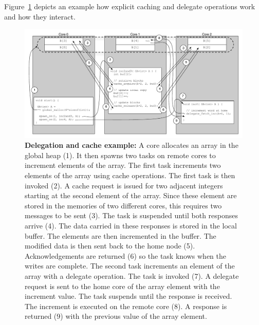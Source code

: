 Figure~\ref{fig:delegate-cache} depicts an example how explicit caching and
delegate operations work and how they interact.

\begin{figure}[htb] \begin{center}
\includegraphics[width=1.5\columnwidth]{figs/delegate-cache}
\begin{minipage}{1.9\columnwidth} \caption{\label{fig:delegate-cache}
\textbf{Delegation and cache example:} A core allocates an array in the global
heap (1). It then spawns two tasks on remote cores to increment elements of
the array. The first task increments two elements of the array using cache
operations. The first task is then invoked (2). A cache request is issued for two
adjacent integers starting at the second element of the array. Since these
element are stored in the memories of two different cores, this requires two messages to be sent (3). The task is suspended until both responses arrive
(4). The data carried in these responses is stored in the local buffer. The
elements are then incremented in the buffer. The modified data is then sent back
to the home node (5). Acknowledgements are returned (6) so the task
knows when the writes are complete. The second task increments an element of
the array with a delegate operation. The task is invoked (7). A delegate
request is sent to the home core of the array element with the increment
value. The task suspends until the response is received. The increment
is executed on the remote core (8). A response is returned (9) with the
previous value of the array element. } \end{minipage} \vspace{-3ex}
\end{center} \end{figure}


